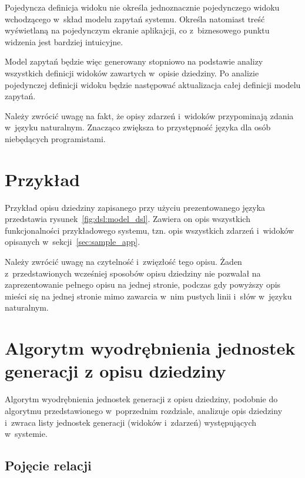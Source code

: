 Pojedyncza definicja widoku nie określa jednoznacznie pojedynczego widoku wchodzącego w~skład modelu zapytań systemu.
Określa natomiast treść wyświetlaną na pojedynczym ekranie aplikajcji, co z~biznesowego punktu widzenia jest bardziej intuicyjne.

Model zapytań będzie więc generowany stopniowo na podstawie analizy wszystkich definicji widoków zawartych w~opisie dziedziny.
Po analizie pojedynczej definicji widoku będzie następować aktualizacja całej definicji modelu zapytań.

Należy zwrócić uwagę na fakt, że opisy zdarzeń i~widoków przypominają zdania w~języku naturalnym.
Znacząco zwiększa to przystępność języka dla osób niebędących programistami.



\section{Przykład}

Przykład opisu dziedziny zapisanego przy użyciu prezentowanego języka przedstawia rysunek~\ref{fig:dsl:model_dsl}.
Zawiera on opis wszystkich funkcjonalności przykładowego systemu, tzn. opis wszystkich zdarzeń i~widoków opisanych w~sekcji~\ref{sec:sample_app}.



Należy zwrócić uwagę na czytelność i~zwięzłość tego opisu.
Żaden z~przedstawionych wcześniej sposobów opisu dziedziny nie pozwalał na zaprezentowanie pełnego opisu na jednej stronie, podczas gdy powyższy opis mieści się na jednej stronie mimo zawarcia w~nim pustych linii i~słów w~języku naturalnym.



\section{Algorytm wyodrębnienia jednostek generacji z opisu dziedziny} \label{sec:dsl:gen_unit_extraction}

Algorytm wyodrębnienia jednostek generacji z opisu dziedziny, podobnie do algorytmu przedstawionego w~poprzednim rozdziale, analizuje opis dziedziny i~zwraca listy jednostek generacji (widoków i~zdarzeń) występujących w~systemie.


\subsection{Pojęcie relacji}

